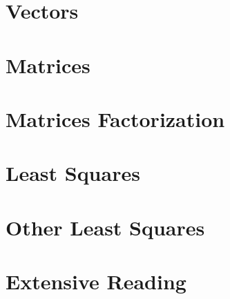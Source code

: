 \ifdefined\printmath

\part{Vectors}







\part{Matrices}



\part{Matrices Factorization}





\part{Least Squares}



\part{Other Least Squares}




\part{Extensive Reading}






% 

% 


